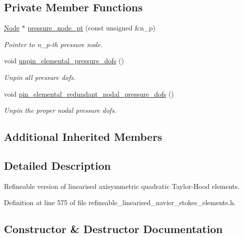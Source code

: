 \subsection*{Private Member Functions}
\begin{DoxyCompactItemize}
\item 
\hyperlink{classoomph_1_1Node}{Node} $\ast$ \hyperlink{classoomph_1_1RefineableLinearisedQTaylorHoodElement_a547bdaeae9d032bfe65d19a7e538dc42}{pressure\+\_\+node\+\_\+pt} (const unsigned \&n\+\_\+p)
\begin{DoxyCompactList}\small\item\em Pointer to n\+\_\+p-\/th pressure node. \end{DoxyCompactList}\item 
void \hyperlink{classoomph_1_1RefineableLinearisedQTaylorHoodElement_a42718cd6cb563e4a07b886ade967c8a2}{unpin\+\_\+elemental\+\_\+pressure\+\_\+dofs} ()
\begin{DoxyCompactList}\small\item\em Unpin all pressure dofs. \end{DoxyCompactList}\item 
void \hyperlink{classoomph_1_1RefineableLinearisedQTaylorHoodElement_a9f9e9989fcfca1fba2b5ba1778897b4a}{pin\+\_\+elemental\+\_\+redundant\+\_\+nodal\+\_\+pressure\+\_\+dofs} ()
\begin{DoxyCompactList}\small\item\em Unpin the proper nodal pressure dofs. \end{DoxyCompactList}\end{DoxyCompactItemize}
\subsection*{Additional Inherited Members}


\subsection{Detailed Description}
Refineable version of linearised axisymmetric quadratic Taylor-\/\+Hood elements. 

Definition at line 575 of file refineable\+\_\+linearised\+\_\+navier\+\_\+stokes\+\_\+elements.\+h.



\subsection{Constructor \& Destructor Documentation}
\mbox{\label{classoomph_1_1RefineableLinearisedQTaylorHoodElement_a342e82b1d86ddbddd7b9fc491ca1ccb6}} 

